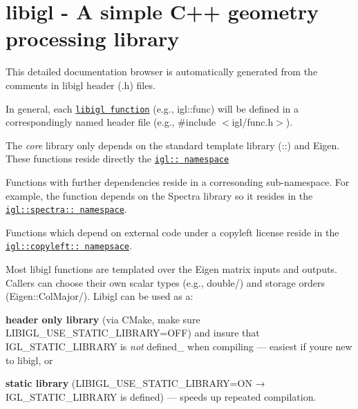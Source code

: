 \chapter{libigl -\/ A simple C++ geometry processing library }
\hypertarget{index}{}\label{index}
\label{index_md_docs_2index}%
%


This detailed documentation browser is automatically generated from the comments in libigl header (.h) files.

In general, each \href{./namespaceigl.html\#func-members}{\texttt{libigl function}} (e.\+g., {\ttfamily igl::\+func}) will be defined in a correspondingly named header file (e.\+g., {\ttfamily \#include \texorpdfstring{$<$}{<}igl/\+func.\+h\texorpdfstring{$>$}{>}}).

The {\itshape core} library only depends on the standard template library ({\ttfamily {}:\+:\+}) and Eigen. These functions reside directly the \href{./namespaceigl.html}{\texttt{{\ttfamily igl:\+:\+} namespace}}

Functions with further dependencies reside in a corresonding sub-\/namespace. For example, the function {\ttfamily {}} depends on the Spectra library so it resides in the \href{./namespaceigl_1_1spectra.html}{\texttt{{\ttfamily igl::\+spectra:\+:\+} namespace}}.

Functions which depend on external code under a copyleft license reside in the \href{file:///Users/alecjacobson/Repos/libigl/dox/namespaceigl_1_1copyleft.html}{\texttt{{\ttfamily igl::\+copyleft:\+:\+} namepsace}}.

Most libigl functions are templated over the Eigen matrix inputs and outputs. Callers can choose their own scalar types (e.\+g., {\ttfamily double}/) and storage orders ({\ttfamily Eigen::\+\+Col\+Major}/). Libigl can be used as a:\+


\begin{DoxyItemize}
\item {\bfseries{header only library}} (via CMake, make sure {\ttfamily LIBIGL\+\_\+\+USE\+\_\+\+STATIC\+\_\+\+LIBRARY=OFF}) and insure that {\ttfamily IGL\+\_\+\+STATIC\+\_\+\+LIBRARY} is {\itshape not} defined\+\_\+ when compiling --- easiest if you\textquotesingle{}re new to libigl, or
\item {\bfseries{static library}} ({\ttfamily LIBIGL\+\_\+\+USE\+\_\+\+STATIC\+\_\+\+LIBRARY=ON} → {\ttfamily IGL\+\_\+\+STATIC\+\_\+\+LIBRARY} is defined) --- speeds up repeated compilation.
\end{DoxyItemize}

